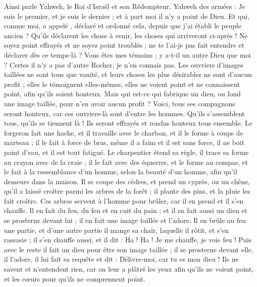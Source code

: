 \begin{multicols}{2}
Ainsi parle Yahweh, le Roi d'Israël et son Rédempteur, Yahweh des armées : Je suis le premier, et je suis le dernier ; et à part moi il n'y a point de Dieu.
Et qui, comme moi, a appelé , déclaré et ordonné cela, depuis que j'ai établi le peuple ancien ? Qu'ils déclarent les chose à venir, les choses qui arriveront ci-après !
Ne soyez point effrayés et ne soyez point troublés ; ne te l'ai-je pas fait entendre et déclarer dès ce temps-là ? Vous êtes mes témoins ; y a-t-il un autre Dieu que moi ? Certes il n'y a pas d'autre Rocher, je n'en connais pas.
Les ouvriers d'images taillées ne sont tous que vanité, et leurs choses les plus désirables ne sont d'aucun profit ; elles le témoignent elles-mêmes, elles ne voient point et ne connaissent point, afin qu'ils soient honteux.
Mais qui est-ce qui fabrique un dieu, ou fond une image taillée, pour n'en avoir aucun profit ?
Voici, tous ses compagnons seront honteux, car ces ouvriers-là sont d'entre les hommes. Qu'ils s'assemblent tous, qu'ils se tiennent là ! Ils seront effrayés et rendus honteux tous ensemble.
Le forgeron fait une hache, et il travaille avec le charbon, et il le forme à coups de marteau ; il le fait à force de bras, même il a faim et il est sans force, il ne boit point d'eau, et il est tout fatigué.
Le charpentier étend sa règle, il trace sa forme au crayon avec de la craie ; il le fait avec des équerres, et le forme au compas, et le fait à la ressemblance d'un homme, selon la beauté d'un homme, afin qu'il demeure dans la maison.
Il se coupe des cèdres, et prend un cyprès, ou un chêne, qu'il a laissé croître parmi les arbres de la forêt ; il plante des pins, et la pluie les fait croître.
Ces arbres servent à l'homme pour brûler, car il en prend et il s'en chauffe. Il en fait du feu, du feu et en cuit du pain ; et il en fait aussi un dieu et se prosterne devant lui ; il en fait une image taillée et l'adore.
Il en brûle au feu une partie, et d'une autre partie il mange sa chair, laquelle il rôtit, et s'en rassasie ; il s'en chauffe aussi, et il dit : Ha ! Ha ! Je me chauffe, je voie feu !
Puis avec le reste il fait un dieu pour être son image taillée ; il se prosterne devant elle, il l'adore, il lui fait sa requête et dit : Délivre-moi, car tu es mon dieu !
Ils ne savent et n'entendent rien, car on leur a plâtré les yeux afin qu'ils ne voient point, et les cœurs pour qu'ils ne comprennent point.

\end{multicols}
